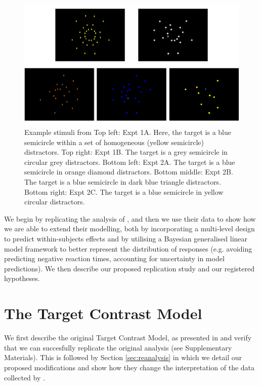 \documentclass[smallextended, natbib]{svjour3}       %
\begin{document}
\begin{figure}
\centering
\includegraphics[width=\textwidth]{../plots/example_stimuli_figure.pdf}
\caption{Example stimuli from \cite{buetti2019predicting} Top left: Expt 1A. Here, the target is a blue semicircle within a set of homogeneous (yellow semicircle) distractors. Top right: Expt 1B. The target is a grey semicircle in circular grey distractors. Bottom left: Expt 2A. The target is a blue semicircle in orange diamond distractors. Bottom middle: Expt 2B. The target is a blue semicircle in dark blue triangle distractors. Bottom right: Expt 2C. The target is a blue semicircle in yellow circular distractors.}
\label{fig:buetti2019_stimulus}
\end{figure}

We begin by replicating the analysis of \cite{buetti2019predicting}, and then we use their data to show how we are able to extend their modelling, both by incorporating a multi-level design to predict within-subjects effects and by utilising a Bayesian generalised linear model framework to better represent the distribution of responses (e.g. avoiding predicting negative reaction times, accounting for uncertainty in model predictions). We then describe our proposed replication study and our registered hypotheses.

\section{The Target Contrast Model}
\label{sec:reansalysis}

We first describe the original Target Contrast Model, as presented in \cite{buetti2019predicting} and verify that we can succesfully replicate the original analysis (see Supplementary Materials). This is followed by Section \ref{sec:reanalysis} in which we detail our proposed modifications and show how they change the interpretation of the data collected by \cite{buetti2019predicting}.
\end{document}
